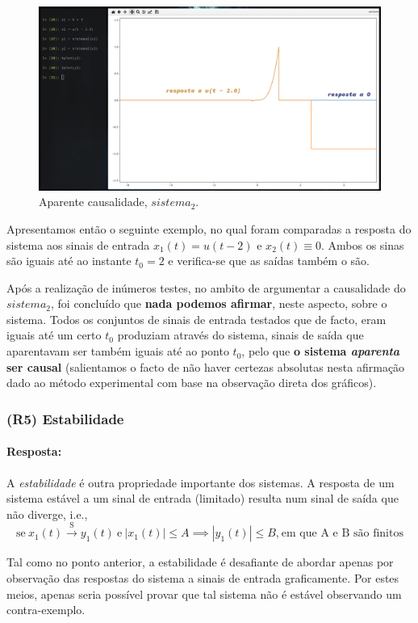 \begin{figure}[H]
    \centering
    \includegraphics[width = 0.5\linewidth]{prints/causalidade.png}
    \caption{Aparente causalidade, \(sistema_2\).}
    \label{fig:causal}
\end{figure}

Apresentamos então o seguinte exemplo, no qual foram comparadas a resposta do sistema aos sinais de entrada \(x_1(t) = u(t-2)\) e \(x_2(t) \equiv 0\). Ambos os sinas são iguais até ao instante \(t_0=2\) e verifica-se que as saídas também o são.

Após a realização de inúmeros testes\footnotemark[2], no ambito de argumentar a causalidade do \(sistema_2\), foi concluído que \textbf{nada podemos afirmar\footnotemark[3]}, neste aspecto, sobre o sistema. Todos os conjuntos de sinais de entrada testados que de facto, eram iguais até um certo \(t_0\) produziam através do sistema, sinais de saída que aparentavam ser também iguais até ao ponto \(t_0\), pelo que \textbf{o sistema \textit{aparenta} ser causal} (salientamos o facto de não haver certezas absolutas nesta afirmação dado ao método experimental com base na observação direta dos gráficos).
\subsubsection{(R5) Estabilidade}
\label{subsubsec:R5}
\paragraph{Resposta:} %
A \textit{estabilidade} é outra propriedade importante dos sistemas. A resposta de um sistema estável a um sinal de entrada (limitado) resulta num sinal de saída que não diverge, i.e.,
    \[ \text{se}\ x_1(t) \xrightarrow[]{\text{S}} y_1(t)\ \text{e}\ |x_1(t)| \leq A \implies |y_1(t)| \leq B \text{,}\ \text{em que A e B são finitos} \]

Tal como no ponto anterior, a estabilidade é desafiante de abordar apenas por observação das respostas do sistema a sinais de entrada graficamente. Por estes meios, apenas seria possível provar que tal sistema não é estável observando um contra-exemplo.

